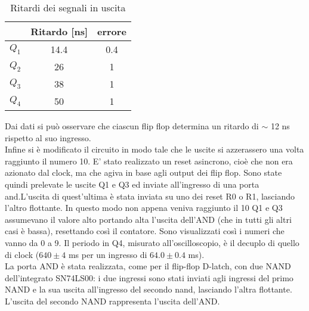 \begin{table}[h]
	\centering
	\begin{tabular}{ccc }
		
		 & Ritardo [ns]& errore\\
		 \midrule 
		  $Q_{1}$ & 14.4 & 0.4 \\
		  $Q_{2}$ & 26 & 1 \\
		  $Q_{3}$ & 38 & 1 \\
          $Q_{4}$ & 50 & 1 \\
 	\end{tabular}
	\caption{ Ritardi dei segnali in uscita }
	\label{t:Ritardi}
\end{table}
Dai dati si può osservare che ciascun flip flop determina un ritardo di $\sim$ 12 ns rispetto al suo ingresso.\\
Infine si è modificato il circuito in modo tale che le uscite si azzerassero una volta raggiunto il numero 10. E' stato realizzato un reset asincrono, cioè che non era azionato dal clock, ma che agiva in base agli output dei flip flop. Sono state quindi prelevate le uscite Q1 e Q3 ed inviate all'ingresso di una porta and.L'uscita di quest'ultima è stata inviata su uno dei reset R0 o R1, lasciando l'altro flottante. In questo modo non appena veniva raggiunto il 10 Q1 e Q3 assumevano il valore alto portando alta l'uscita dell'AND (che in tutti gli altri casi è bassa), resettando così il contatore. Sono visualizzati così i numeri che vanno da 0 a 9. Il periodo in Q4, misurato all'oscilloscopio, è il decuplo di quello di clock ($640 \pm 4$ ms per un ingresso di $64.0 \pm 0.4$ ms).\\
La porta AND è stata realizzata, come per il flip-flop D-latch, con due NAND dell'integrato SN74LS00: i due ingressi sono stati inviati agli ingressi del primo NAND e la sua uscita all'ingresso del secondo nand, lasciando l'altra flottante. L'uscita del secondo NAND rappresenta l'uscita dell'AND.